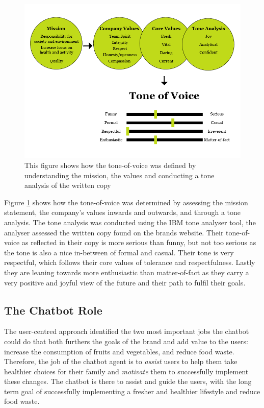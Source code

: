         \begin{figure}
            \centering
            \includegraphics[width=\textwidth]{figures/Tone-of-voice.png}
            \caption{This figure shows how the tone-of-voice was defined by understanding the mission, the values and conducting a tone analysis of the written copy}
            \label{fig:tov}
        \end{figure}
    
        Figure \ref{fig:tov} shows how the tone-of-voice was determined by assessing the mission statement, the company's values inwards and outwards, and through a tone analysis. The tone analysis was conducted using the IBM tone analyser tool, the analyser assessed the written copy found on the brands website. Their tone-of-voice as reflected in their copy is more serious than funny, but not too serious as the tone is also a nice in-between of formal and casual. Their tone is very respectful, which follows their core values of tolerance and respectfulness. Lastly they are leaning towards more enthusiastic than matter-of-fact as they carry a very positive and joyful view of the future and their path to fulfil their goals.

\vspace{5mm}

    \subsection{The Chatbot Role}
    
    The user-centred approach identified the two most important jobs the chatbot could do that both furthers the goals of the brand and add value to the users: increase the consumption of fruits and vegetables, and reduce food waste. Therefore, the job of the chatbot agent is to \textit{assist} users to help them take healthier choices for their family and \textit{motivate} them to successfully implement these changes. The chatbot is there to assist and guide the users, with the long term goal of successfully implementing a fresher and healthier lifestyle and reduce food waste. 
    
